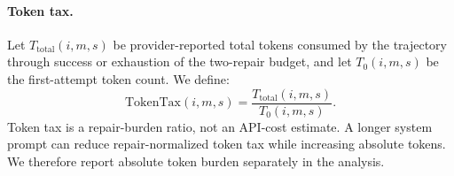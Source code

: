 \paragraph{Token tax.}
Let $T_{\mathrm{total}}(i,m,s)$ be provider-reported total tokens consumed by
the trajectory through success or exhaustion of the two-repair budget, and let
$T_{0}(i,m,s)$ be the first-attempt token count. We define:
\[
\mathrm{TokenTax}(i,m,s)=\frac{T_{\mathrm{total}}(i,m,s)}{T_{0}(i,m,s)}.
\]
Token tax is a repair-burden ratio, not an API-cost estimate. A longer system
prompt can reduce repair-normalized token tax while increasing absolute tokens.
We therefore report absolute token burden separately in the analysis.
